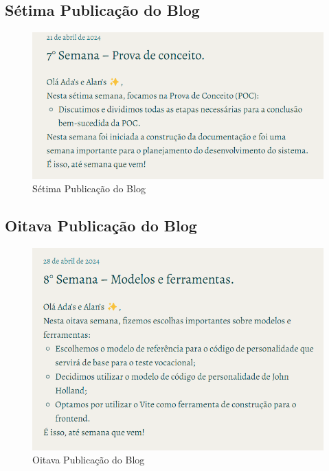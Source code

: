 \begin{apendicesenv}
\subsection*{Sétima Publicação do Blog}
\begin{figure}[H]
    \centering
    \includegraphics[width=1.0\linewidth]{images/Post7.png}
    \caption{Sétima Publicação do Blog}
    \label{fig:setima}
\end{figure}

\subsection*{Oitava Publicação do Blog}
\begin{figure}[H]
    \centering
    \includegraphics[width=1.0\linewidth]{images/Post8.png}
    \caption{Oitava Publicação do Blog}
    \label{fig:oitava}
\end{figure}


\end{apendicesenv}
